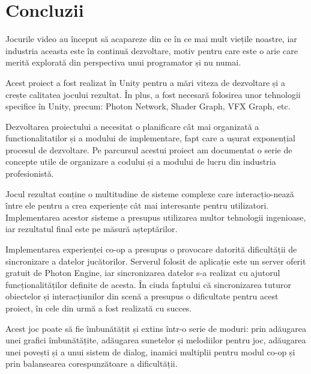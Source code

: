 \documentclass[12pt, a4paper]{article}
\begin{document}
	
	
	
	
	\section{Concluzii}
	
	Jocurile video au început să acapareze din ce în ce mai mult viețile noastre, iar industria aceasta este în continuă dezvoltare, motiv pentru care este o arie care merită explorată din perspectiva unui programator și nu numai.
	\newline
	
	Acest proiect a fost realizat în Unity pentru a mări viteza de dezvoltare și a crește calitatea jocului rezultat. În plus, a fost necesară folosirea unor tehnologii specifice în Unity, precum: Photon Network, Shader Graph, VFX Graph, etc.
	\newline
	
	Dezvoltarea proiectului a necesitat o planificare cât mai organizată a functionalitatilor și a modului de implementare, fapt care a ușurat exponențial procesul de dezvoltare. Pe parcursul acestui proiect am documentat o serie de concepte utile de organizare a codului și a modului de lucru din industria profesionistă.
	\newline
	
	Jocul rezultat conține o multitudine de sisteme complexe care interacțio-nează între ele pentru a crea experiențe cât mai interesante pentru utilizatori. Implementarea acestor sisteme a presupus utilizarea multor tehnologii ingenioase, iar rezultatul final este pe măsură așteptărilor.
	\newline
	
	Implementarea experienței co-op a presupus o provocare datorită dificultății de sincronizare a datelor jucătorilor. Serverul folosit de aplicație este un server oferit gratuit de Photon Engine, iar sincronizarea datelor s-a realizat cu ajutorul funcționalităților definite de acesta. În ciuda faptului că sincronizarea tuturor obiectelor și interacțiunilor din scenă a presupus o dificultate pentru acest proiect, în cele din urmă a fost realizată cu succes.
	\newline
	
	Acest joc poate să fie îmbunătățit și extins într-o serie de moduri: prin adăugarea unei grafici îmbunătățite, adăugarea sunetelor și melodiilor pentru joc, adăugarea unei povești și a unui sistem de dialog, inamici multiplii pentru modul co-op și prin balansearea corespunzătoare a dificultății.
	\newline
	
\end{document}

